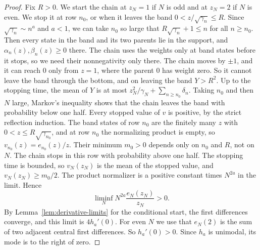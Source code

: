 \begin{proof}
Fix $R>0$. We start the chain at $z_N=1$ if $N$ is odd and at $z_N=2$
if $N$ is even. We stop it at row $n_0$, or when it leaves the band
$0<z/\sqrt{\gamma_n}\le R$. Since $\sqrt{\gamma_n}\sim n^a$ and $a<1$,
we can take $n_0$ so large that $R\sqrt{\gamma_n}+1\le n$ for all
$n\ge n_0$. Then every state in the band and its two parents lie in
the support, and $\alpha_n(z),\beta_n(z)\ge0$ there. The chain uses the
weights only at band states before it stops, so we need their
nonnegativity only there. The chain moves by $\pm1$, and it can reach
$0$ only from $z=1$, where the parent $0$ has weight zero. So it
cannot leave the band through the bottom, and on leaving the band
$Y>R^2$. Up to the stopping time, the mean of $Y$ is at most
$z_N^2/\gamma_N+\sum_{n\ge n_0}\delta_n$. Taking $n_0$ and then $N$
large, Markov's inequality shows that the chain leaves the band with
probability below one half. Every stopped value of $v$ is positive,
by the strict reflection induction. The band states of row $n_0$ are
the finitely many $z$ with $0<z\le R\sqrt{\gamma_{n_0}}$, and at row
$n_0$ the normalizing product is empty, so $v_{n_0}(z)=e_{n_0}(z)/z$.
Their minimum $m_0>0$ depends only on $n_0$ and $R$, not on $N$. The
chain stops in this row with probability above one half. The
stopping time is bounded, so $v_N(z_N)$ is the mean of the stopped
value, and $v_N(z_N)\ge m_0/2$. The
product normalizer is a positive constant times $N^{2a}$ in the
limit. Hence
\[
 \liminf_N N^{2a}\frac{e_N(z_N)}{z_N}>0.
\]
By Lemma~\ref{lem:derivative-limits} for the conditional start,
the first differences converge, and this limit is $4h_a'(0)$. For
even $N$ we use that $e_N(2)$ is the sum of two adjacent central first
differences. So
$h_a'(0)>0$. Since $h_a$ is unimodal, its mode is to the right of
zero.
\end{proof}

